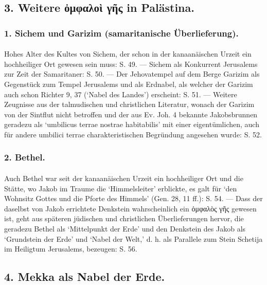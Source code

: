\documentclass[a4paper, 11pt, oneside]{article}
\begin{document}
\subsection*{3. Weitere ὀμφαλοὶ γῆς in Palästina.}
\subsubsection*{1. Sichem und Garizim (samaritanische Überlieferung).}
\paragraph{}
Hohes Alter des Kultes von Sichem, der schon in der kanaanäischen Urzeit ein hochheiliger Ort gewesen sein muss: S. 49. --- Sichem als Konkurrent Jerusalems zur Zeit der Samaritaner: S. 50. --- Der Jehovatempel auf dem Berge Garizim als Gegenstück zum Tempel Jerusalems und als Erdnabel, als welcher der Garizim auch schon Richter 9, 37 (`Nabel des Landes') erscheint: S. 51. --- Weitere Zeugnisse aus der talmudischen und christlichen Literatur, wonach der Garizim von der Sintflut nicht betroffen und der aus Ev. Joh. 4 bekannte Jakobsbrunnen geradezu als `umbilicus terrae nostrae habitabilis' mit einer eigentümlichen, auch für andere umbilici terrae charakteristischen Begründung angesehen wurde: S. 52.

\subsubsection*{2. Bethel.}
\paragraph{}
Auch Bethel war seit der kanaanäischen Urzeit ein hochheiliger Ort und die Stätte, wo Jakob im Traume die `Himmelsleiter' erblickte, es galt für `den Wohnsitz Gottes und die Pforte des Himmels' (Gen. 28, 11 ff.): S. 54. --- Dass der daselbst von Jakob errichtete Denkstein wahrscheinlich ein ὀμφαλὸς γῆς gewesen ist, geht aus späteren jüdischen und christlichen Überlieferungen hervor, die geradezu Bethel als `Mittelpunkt der Erde' und den Denkstein des Jakob als `Grundstein der Erde' und `Nabel der Welt,' d. h. als Parallele zum Stein Schetija im Heiligtum Jerusalems, bezeugen: S. 56.

\subsection*{4. Mekka als Nabel der Erde.}
\end{document}
